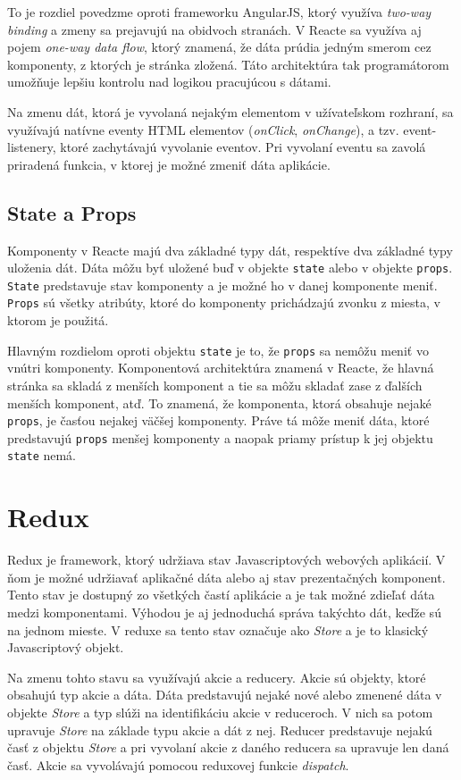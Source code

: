 \documentclass[
  digital, %
  table,   %
  lof,     %
  lot,     %
]{fithesis3}
\begin{document}
To je rozdiel povedzme oproti frameworku AngularJS, ktorý využíva \textit{two-way binding} a zmeny sa prejavujú na obidvoch stranách. V Reacte sa využíva aj pojem \textit{one-way data flow}, ktorý znamená, že dáta prúdia jedným smerom cez komponenty, z ktorých je stránka zložená. Táto architektúra tak programátorom umožňuje lepšiu kontrolu nad logikou pracujúcou s dátami.

Na zmenu dát, ktorá je vyvolaná nejakým elementom v užívateľskom rozhraní, sa využívajú natívne eventy HTML elementov (\textit{onClick}, \textit{onChange}), a tzv. event-listenery, ktoré zachytávajú vyvolanie eventov. Pri vyvolaní eventu sa zavolá priradená funkcia, v ktorej je možné zmeniť dáta aplikácie.

\subsection{State a Props}
Komponenty v Reacte majú dva základné typy dát, respektíve dva základné typy uloženia dát. Dáta môžu byť uložené buď v objekte \texttt{state} alebo v objekte \texttt{props}. \texttt{State} predstavuje stav komponenty a je možné ho v danej komponente meniť. \texttt{Props} sú všetky atribúty, ktoré do komponenty prichádzajú zvonku z miesta, v ktorom je použitá.

Hlavným rozdielom oproti objektu \texttt{state} je to, že \texttt{props} sa nemôžu meniť vo vnútri komponenty. Komponentová architektúra znamená v Reacte, že hlavná stránka sa skladá z menších komponent a tie sa môžu skladať zase z ďalších menších komponent, atď. To znamená, že komponenta, ktorá obsahuje nejaké \texttt{props}, je časťou nejakej väčšej komponenty. Práve tá môže meniť dáta, ktoré predstavujú \texttt{props} menšej komponenty a naopak priamy prístup k jej objektu \texttt{state} nemá.

\section{Redux}
Redux je framework, ktorý udržiava stav Javascriptových webových aplikácií. V ňom je možné udržiavať aplikačné dáta alebo aj stav prezentačných komponent. Tento stav je dostupný zo všetkých častí aplikácie a je tak možné zdieľať dáta medzi komponentami. Výhodou je aj jednoduchá správa takýchto dát, keďže sú na jednom mieste. V reduxe sa tento stav označuje ako \textit{Store} a je to klasický Javascriptový objekt.

Na zmenu tohto stavu sa využívajú akcie a reducery. Akcie sú objekty, ktoré obsahujú typ akcie a dáta. Dáta predstavujú nejaké nové alebo zmenené dáta v objekte \textit{Store} a typ slúži na identifikáciu akcie v reduceroch. V nich sa potom upravuje \textit{Store} na základe typu akcie a dát z nej. Reducer predstavuje nejakú časť z objektu \textit{Store} a pri vyvolaní akcie z daného reducera sa upravuje len daná časť. Akcie sa vyvolávajú pomocou reduxovej funkcie \textit{dispatch}.
\end{document}
